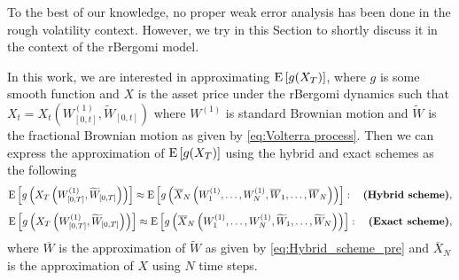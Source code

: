 To the best of our knowledge, no proper weak error
analysis has been done in the rough volatility context. However, we try in this Section  to shortly discuss it in the context of the rBergomi model.

In this work, we are interested in approximating $\mathrm{E}\left[g(X_T)\right]$, where $g$ is some smooth function and $X$ is the asset price under the rBergomi dynamics such that $X_t=X_t(W^{(1)}_{[0,t]},\widetilde{W}_{[0,t]})$ where $W^{(1)}$ is standard Brownian motion and  $\widetilde{W}$ is the fractional Brownian motion as given by \eqref{eq:Volterra process}.  Then we can express the approximation of $\mathrm{E}\left[g(X_T)\right]$  using the  hybrid and exact schemes as the following 
\begin{align*}
\mathrm{E}\left[g\left(X_T\left(W^{(1)}_{[0,T]},\widetilde{W}_{[0,T]}\right)\right)\right] \approx \mathrm{E}\left[g\left(\overline{X}_N\left(W^{(1)}_1,\dots,W^{(1)}_N, \overline{W}_1, \dots,\overline{W}_N\right)\right)\right]:\quad \textbf{(Hybrid  scheme)},
\end{align*}
\begin{align*}
\mathrm{E}\left[g\left(X_T\left(W^{(1)}_{[0,T]},\widetilde{W}_{[0,T]}\right)\right)\right] \approx \mathrm{E}\left[g\left(\overline{X}_N\left(W^{(1)}_1,\dots,W^{(1)}_N, \widetilde{W}_1, \dots,\widetilde{W}_N\right)\right)\right]:\quad \textbf{(Exact  scheme)},
\end{align*}
where $\overline{W}$ is the approximation of $\widetilde{W}$  as given by \eqref{eq:Hybrid_scheme_pre} and $\overline{X}_N$ is the approximation of $X$ using $N$ time steps.

